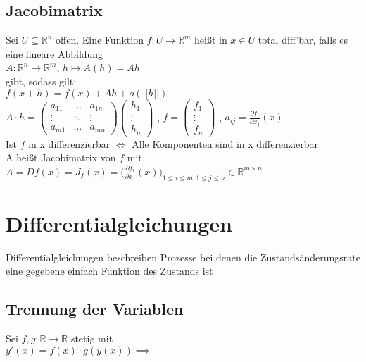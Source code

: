 \documentclass[a4paper,9pt]{extarticle}
\begin{document}
	\subsection*{Jacobimatrix}
	Sei $U ⊆ \mathbb{R}^n$ offen. Eine Funktion $f:U → \mathbb{R}^m$ heißt in $x \in U$ total diff'bar, falls es eine lineare Abbildung \\
	$A : \mathbb{R}^n → \mathbb{R}^m$, $h \mapsto A(h) = Ah$ \\
	gibt, sodass gilt: \\
	$f(x+h) = f(x) + Ah + o(||h||)$ \\
	$A ⋅ h = \begin{pmatrix}
		a_{11} & \dots & a_{1n} \\
		\vdots & \ddots & \vdots \\
		a_{m1} & \dots & a_{mn}		
	\end{pmatrix}
	\begin{pmatrix}
		h_1 \\
		\vdots \\
		h_n
	\end{pmatrix}$
	, $f = \begin{pmatrix}
		f_1 \\
		\vdots \\
		f_n
	\end{pmatrix}$
	, $a_{ij} = \frac{\partial f_i}{\partial x_j} (x)$ \\
	
	Ist $f$ in x differenzierbar $\iff$ Alle Komponenten sind in x differenzierbar \\
	
	A heißt Jacobimatrix von $f$ mit \\
	$A = Df(x) = J_f(x) = \Big(\frac{\partial f_i}{\partial x_j} (x)\Big)_{1 ≤ i ≤ m, 1 ≤ j ≤ n} \in \mathbb{R}^{m \times n}$
	
	\pagebreak
	
\section*{Differentialgleichungen}
	Differentialgleichungen beschreiben Prozesse bei denen die Zustandsänderungsrate eine gegebene einfach Funktion des Zustands ist
	
	\subsection*{Trennung der Variablen}
	Sei $f,g : \mathbb{R} → \mathbb{R}$ stetig mit \\
	$y'(x) = f(x) ⋅ g(y(x)) \implies$ \\
	
\end{document}
